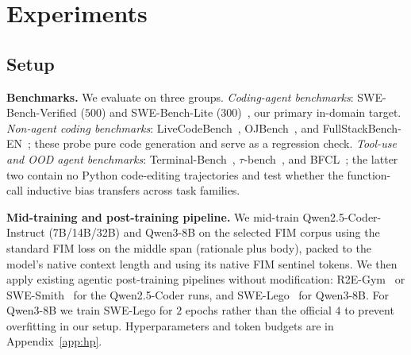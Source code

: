 
\section{Experiments}
\label{sec:exp}
\vspace{-0.5ex}

\subsection{Setup}
\label{sec:exp:setup}

\textbf{Benchmarks.} We evaluate on three groups.
\emph{Coding-agent benchmarks}: SWE-Bench-Verified ($500$) and
SWE-Bench-Lite ($300$)~\citep{swebench}, our primary in-domain target.
\emph{Non-agent coding benchmarks}: LiveCodeBench~\citep{livecodebench},
OJBench~\citep{ojbench}, and FullStackBench-EN~\citep{fullstackbench};
these probe pure code generation and serve as a regression check.
\emph{Tool-use and OOD agent benchmarks}: Terminal-Bench~\citep{terminalbench},
$\tau$-bench~\citep{taubench}, and BFCL~\citep{bfcl}; the latter two
contain no Python code-editing trajectories and test whether the
function-call inductive bias transfers across task families.

\textbf{Mid-training and post-training pipeline.}
We mid-train Qwen2.5-Coder-Instruct (7B/14B/32B) and Qwen3-8B on the
selected FIM corpus using the standard FIM loss on the middle span
(rationale plus body), packed to the model's native context length and
using its native FIM sentinel tokens. We then apply existing agentic
post-training pipelines without modification:
R2E-Gym~\citep{r2egym} or SWE-Smith~\citep{swesmith} for the
Qwen2.5-Coder runs, and SWE-Lego~\citep{swelego} for Qwen3-8B. For
Qwen3-8B we train SWE-Lego for $2$ epochs rather than the official $4$
to prevent overfitting in our setup. Hyperparameters and token budgets
are in Appendix~\ref{app:hp}.

